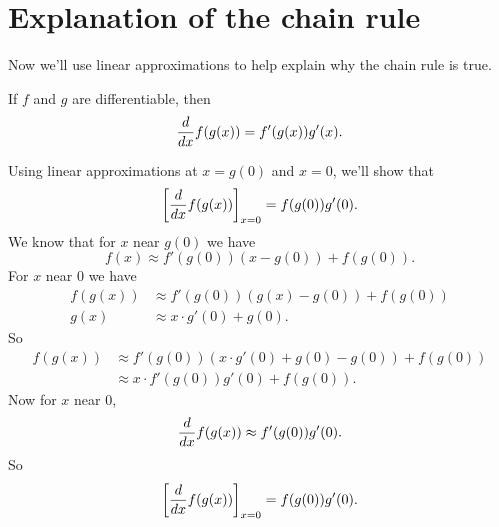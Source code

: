 \documentclass{ximera}
\begin{document}
\section{Explanation of the chain rule}

Now we'll use linear approximations to help explain why the chain rule
is true.

\begin{theorem}
If $f$ and $g$ are differentiable, then
\[
\frac{d}{dx} f(g(x)) = f'(g(x))g'(x).
\]
\begin{explanation}
   Using linear approximations at $x=g(0)$ and $x=0$, we'll show that
  \[
  \bigg[ \frac{d}{dx} f(g(x)) \bigg]_{x=0} = f(g(0))g'(0).
  \]
  We know that for $x$ near $g(0)$ we have
  \[
  f(x) \approx f'(g(0)) (x-g(0)) + f(g(0)).
  \]
  For $x$ near $0$ we have
  \begin{align*}
    f(g(x)) &\approx f'(g(0)) (g(x)-g(0)) + f(g(0))\\
    g(x) &\approx x\cdot g'(0) + g(0).
  \end{align*}
  So
  \begin{align*}
  f(g(x)) &\approx f'(g(0)) (x\cdot g'(0) + g(0)-g(0)) + f(g(0))\\
  &\approx x\cdot f'(g(0))g'(0) + f(g(0)).
  \end{align*}
  Now for $x$ near $0$,
  \[
  \frac{d}{dx} f(g(x)) \approx f'(g(0))g'(0).
  \]
  So
  \[
  \bigg[ \frac{d}{dx} f(g(x)) \bigg]_{x=0} = f(g(0))g'(0).
  \]
\end{explanation}
\end{theorem}



          
\end{document}
